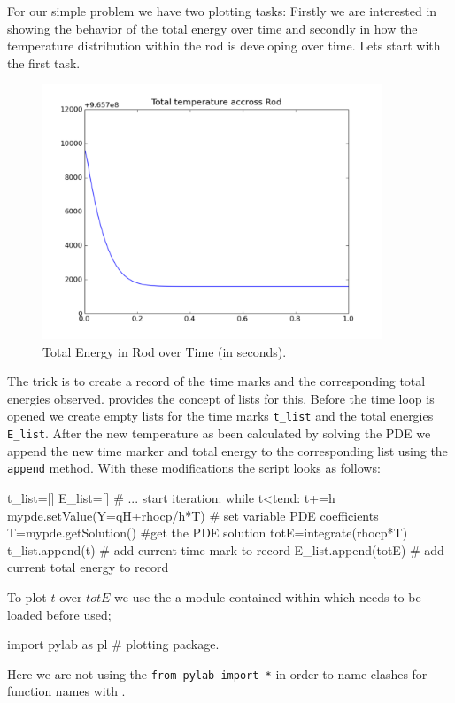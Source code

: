 For our simple problem we have two plotting tasks: Firstly we are interested in showing the
behavior of the total energy over time and secondly in how the temperature distribution within the rod is 
developing over time. Lets start with the first task.

\begin{figure}
\begin{center}
\includegraphics[width=4in]{figures/ttrodpyplot150}
\caption{Total Energy in Rod over Time (in seconds).}
\label{fig:onedheatout1} 
\end{center}
\end{figure}

The trick is to create a record of the time marks and the corresponding total energies observed.
\pyt provides the concept of lists for this. Before 
the time loop is opened we create empty lists for the time marks \verb|t_list| and the total energies \verb|E_list|. 
After the new temperature as been calculated by solving the PDE we append the new time marker and total energy
to the corresponding list using the \verb|append| method. With these modifications the script looks as follows:
\begin{python}
t_list=[]
E_list=[]
# ... start iteration:
while t<tend:
      t+=h
      mypde.setValue(Y=qH+rhocp/h*T) # set variable PDE coefficients
      T=mypde.getSolution() #get the PDE solution
      totE=integrate(rhocp*T) 
      t_list.append(t)   # add current time mark to record
      E_list.append(totE) # add current total energy to record
\end{python}
To plot $t$ over $totE$ we use the \mpl a module contained within \pylab which needs to be loaded before used;
\begin{python}
import pylab as pl # plotting package.
\end{python}
Here we are not using the \verb|from pylab import *| in order to name clashes for function names 
with \esc. 

